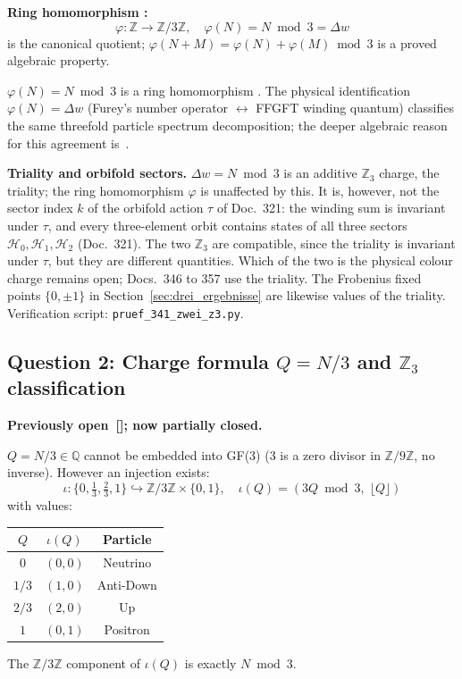 \textbf{Ring homomorphism \BM:}
\begin{equation}
  \varphi: \mathbb{Z} \to \mathbb{Z}/3\mathbb{Z}, \quad \varphi(N) = N\bmod 3 = \Delta w
\end{equation}
is the canonical quotient; $\varphi(N+M)=\varphi(N)+\varphi(M)\bmod 3$
is a proved algebraic property.

\begin{keyresult}
$\varphi(N) = N\bmod 3$ is a ring homomorphism \BM.
The physical identification $\varphi(N) = \Delta w$
(Furey's number operator $\leftrightarrow$ FFGFT winding quantum)
classifies the same threefold particle spectrum decomposition;
the deeper algebraic reason for this agreement is~\KM.
\end{keyresult}

\textbf{Triality and orbifold sectors.}
$\Delta w=N\bmod 3$ is an additive $\mathbb{Z}_3$ charge, the triality;
the ring homomorphism $\varphi$ is unaffected by this. It is, however, not the
sector index $k$ of the orbifold action $\tau$ of Doc.~321: the winding sum is
invariant under $\tau$, and every three-element orbit contains states of all
three sectors $\mathcal H_0,\mathcal H_1,\mathcal H_2$ (Doc.~321). The two
$\mathbb{Z}_3$ are compatible, since the triality is invariant under $\tau$,
but they are different quantities. Which of the two is the physical colour
charge remains open; Docs.~346 to 357 use the triality. The Frobenius fixed
points $\{0,\pm1\}$ in Section~\ref{sec:drei_ergebnisse} are likewise values
of the triality. Verification script: \texttt{pruef\_341\_zwei\_z3.py}.

\subsection{Question 2: Charge formula $Q=N/3$ and $\mathbb{Z}_3$ classification}

\textbf{Previously open~[\SM]; now partially closed.}

$Q = N/3\in\mathbb{Q}$ cannot be embedded into GF(3)
(3 is a zero divisor in $\mathbb{Z}/9\mathbb{Z}$, no inverse).
However an injection exists:
\begin{equation}
  \iota: \{0,\tfrac{1}{3},\tfrac{2}{3},1\} \hookrightarrow
  \mathbb{Z}/3\mathbb{Z}\times\{0,1\},\quad
  \iota(Q) = (3Q\bmod 3,\;\lfloor Q\rfloor)
\end{equation}
with values:
\begin{center}
\begin{tabular}{ccc}
\toprule
$Q$ & $\iota(Q)$ & Particle \\
\midrule
$0$   & $(0,0)$ & Neutrino \\
$1/3$ & $(1,0)$ & Anti-Down \\
$2/3$ & $(2,0)$ & Up \\
$1$   & $(0,1)$ & Positron \\
\bottomrule
\end{tabular}
\end{center}
The $\mathbb{Z}/3\mathbb{Z}$ component of $\iota(Q)$ is exactly $N\bmod 3$.

